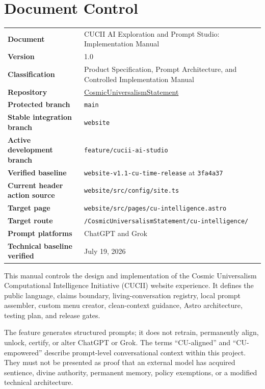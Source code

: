 \documentclass[11pt,letterpaper]{article}
\newcommand{\ProjectTitle}{CUCII AI Exploration and Prompt Studio}
\newcommand{\DocumentTitle}{Implementation Manual}
\newcommand{\RepositoryName}{CosmicUniversalismStatement}
\newcommand{\RepositoryURL}{https://github.com/willmaddock/CosmicUniversalismStatement}
\newcommand{\StableBranch}{website}
\newcommand{\FeatureBranch}{feature/cucii-ai-studio}
\newcommand{\TargetRoute}{/CosmicUniversalismStatement/cu-intelligence/}
\newcommand{\BaselineTag}{website-v1.1-cu-time-release}
\newcommand{\BaselineCommit}{3fa4a37}
\newcommand{\DocumentVersion}{1.0}
\newcommand{\VerificationDate}{July 19, 2026}
\newcommand{\filepath}[1]{\texttt{#1}}
\newcommand{\branchname}[1]{\texttt{#1}}
\begin{document}
\pagecolor{white}
\color{CUText}

\section*{Document Control}

\begin{tabularx}{\textwidth}{>{\bfseries}L{1.95in}Y}
\toprule
Document & \ProjectTitle: \DocumentTitle \\
Version & \DocumentVersion \\
Classification & Product Specification, Prompt Architecture, and Controlled Implementation Manual \\
Repository & \href{\RepositoryURL}{\RepositoryName} \\
Protected branch & \branchname{main} \\
Stable integration branch & \branchname{\StableBranch} \\
Active development branch & \branchname{\FeatureBranch} \\
Verified baseline & \branchname{\BaselineTag} at \texttt{\BaselineCommit} \\
Current header action source & \filepath{website/src/config/site.ts} \\
Target page & \filepath{website/src/pages/cu-intelligence.astro} \\
Target route & \texttt{\TargetRoute} \\
Prompt platforms & ChatGPT and Grok \\
Technical baseline verified & \VerificationDate \\
\bottomrule
\end{tabularx}

\begin{purposebox}
This manual controls the design and implementation of the Cosmic Universalism
Computational Intelligence Initiative (CUCII) website experience. It defines the
public language, claims boundary, living-conversation registry, local prompt
assembler, custom menu creator, clean-context guidance, Astro architecture,
testing plan, and release gates.
\end{purposebox}

\begin{safetybox}
The feature generates structured prompts; it does not retrain, permanently align,
unlock, certify, or alter ChatGPT or Grok. The terms ``CU-aligned'' and
``CU-empowered'' describe prompt-level conversational context within this project.
They must not be presented as proof that an external model has acquired sentience,
divine authority, permanent memory, policy exemptions, or a modified technical
architecture.
\end{safetybox}
\end{document}
